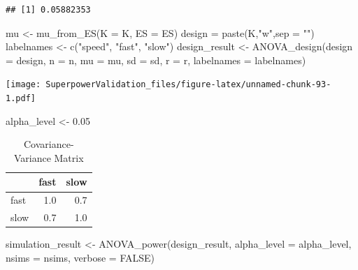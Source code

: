 \documentclass[
]{book}
\newenvironment{Shaded}{\begin{snugshade}}{\end{snugshade}}
\newcommand{\AttributeTok}[1]{\textcolor[rgb]{0.77,0.63,0.00}{#1}}
\newcommand{\ConstantTok}[1]{\textcolor[rgb]{0.00,0.00,0.00}{#1}}
\newcommand{\FloatTok}[1]{\textcolor[rgb]{0.00,0.00,0.81}{#1}}
\newcommand{\FunctionTok}[1]{\textcolor[rgb]{0.00,0.00,0.00}{#1}}
\newcommand{\NormalTok}[1]{#1}
\newcommand{\OtherTok}[1]{\textcolor[rgb]{0.56,0.35,0.01}{#1}}
\newcommand{\StringTok}[1]{\textcolor[rgb]{0.31,0.60,0.02}{#1}}
\begin{document}
\begin{verbatim}
## [1] 0.05882353
\end{verbatim}

\begin{Shaded}
\begin{Highlighting}[]
\NormalTok{mu }\OtherTok{\textless{}{-}} \FunctionTok{mu\_from\_ES}\NormalTok{(}\AttributeTok{K =}\NormalTok{ K, }\AttributeTok{ES =}\NormalTok{ ES)}
\NormalTok{design }\OtherTok{=} \FunctionTok{paste}\NormalTok{(K,}\StringTok{"w"}\NormalTok{,}\AttributeTok{sep =} \StringTok{""}\NormalTok{)}
\NormalTok{labelnames }\OtherTok{\textless{}{-}} \FunctionTok{c}\NormalTok{(}\StringTok{"speed"}\NormalTok{, }\StringTok{"fast"}\NormalTok{, }\StringTok{"slow"}\NormalTok{)}
\NormalTok{design\_result }\OtherTok{\textless{}{-}} \FunctionTok{ANOVA\_design}\NormalTok{(}\AttributeTok{design =}\NormalTok{ design,}
                   \AttributeTok{n =}\NormalTok{ n, }\AttributeTok{mu =}\NormalTok{ mu, }\AttributeTok{sd =}\NormalTok{ sd, }\AttributeTok{r =}\NormalTok{ r, }
                   \AttributeTok{labelnames =}\NormalTok{ labelnames)}
\end{Highlighting}
\end{Shaded}

\texttt{[image: SuperpowerValidation\_files/figure-latex/unnamed-chunk-93-1.pdf]}

\begin{Shaded}
\begin{Highlighting}[]
\NormalTok{alpha\_level }\OtherTok{\textless{}{-}} \FloatTok{0.05}
\end{Highlighting}
\end{Shaded}

\begin{table}[!h]

\caption{\label{tab:unnamed-chunk-94}Covariance-Variance Matrix}
\centering
\begin{tabular}[t]{l|r|r}
\hline
  & fast & slow\\
\hline
fast & 1.0 & 0.7\\
\hline
slow & 0.7 & 1.0\\
\hline
\end{tabular}
\end{table}
\newpage

\begin{Shaded}
\begin{Highlighting}[]
\NormalTok{simulation\_result }\OtherTok{\textless{}{-}} \FunctionTok{ANOVA\_power}\NormalTok{(design\_result, }
                                 \AttributeTok{alpha\_level =}\NormalTok{ alpha\_level, }
                                 \AttributeTok{nsims =}\NormalTok{ nsims,}
                                 \AttributeTok{verbose =} \ConstantTok{FALSE}\NormalTok{)}
\end{Highlighting}
\end{Shaded}
\end{document}
